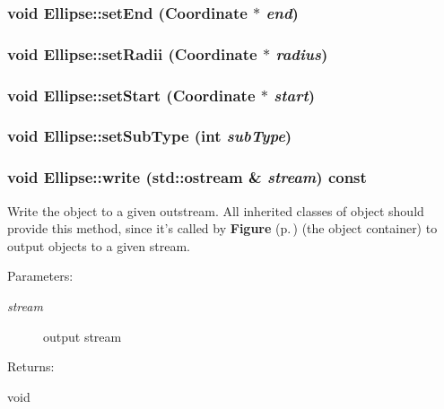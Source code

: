 \subsubsection{\setlength{\rightskip}{0pt plus 5cm}void Ellipse::set\-End ({\bf Coordinate} $\ast$ {\em end})\hspace{0.3cm}{\tt  [inline]}}\label{classEllipse_a11}


\subsubsection{\setlength{\rightskip}{0pt plus 5cm}void Ellipse::set\-Radii ({\bf Coordinate} $\ast$ {\em radius})\hspace{0.3cm}{\tt  [inline]}}\label{classEllipse_a7}


\subsubsection{\setlength{\rightskip}{0pt plus 5cm}void Ellipse::set\-Start ({\bf Coordinate} $\ast$ {\em start})\hspace{0.3cm}{\tt  [inline]}}\label{classEllipse_a9}


\subsubsection{\setlength{\rightskip}{0pt plus 5cm}void Ellipse::set\-Sub\-Type (int {\em sub\-Type})\hspace{0.3cm}{\tt  [inline, protected]}}\label{classEllipse_b0}


\subsubsection{\setlength{\rightskip}{0pt plus 5cm}void Ellipse::write (std::ostream \& {\em stream}) const\hspace{0.3cm}{\tt  [virtual]}}\label{classEllipse_a13}


Write the object to a given outstream. All inherited classes of object should provide this method, since it's called by {\bf Figure} {\rm (p.\,\pageref{classFigure})} (the object container) to output objects to a given stream. \begin{Desc}
\item[Parameters: ]\par
\begin{description}
\item[{\em 
stream}]output stream \end{description}
\end{Desc}
\begin{Desc}
\item[Returns: ]\par
void \end{Desc}


